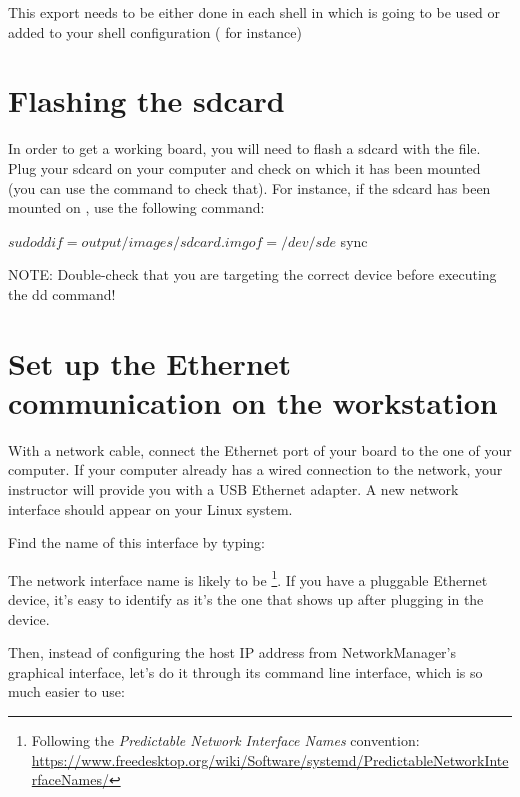 This export needs to be either done in each shell in which  is
going to be used or added to your shell configuration ( for
instance)

\section{Flashing the sdcard}

In order to get a working board, you will need to flash a sdcard with the 
 file. Plug your sdcard on your computer and
check on which  it has been mounted (you can use the 
command to check that). For instance, if the sdcard has been mounted on
, use the following command:

\begin{bashinput}
$ sudo dd if=output/images/sdcard.img of=/dev/sde
$ sync
\end{bashinput}

NOTE: Double-check that you are targeting the correct device before executing
the dd command!

\if{}

\fi
\if{}

\fi

\section{Set up the Ethernet communication on the workstation}

With a network cable, connect the Ethernet port of your board to the
one of your computer. If your computer already has a wired connection
to the network, your instructor will provide you with a USB Ethernet
adapter. A new network interface should appear on your Linux system.

Find the name of this interface by typing:

The network interface name is likely to be
\footnote{Following the {\em Predictable Network Interface
Names} convention:
\url{https://www.freedesktop.org/wiki/Software/systemd/PredictableNetworkInterfaceNames/}}.
If you have a pluggable Ethernet device, it's easy to identify as it's
the one that shows up after plugging in the device.

Then, instead of configuring the host IP address from NetworkManager’s graphical interface,
let’s do it through its command line interface, which is so much easier to use:

